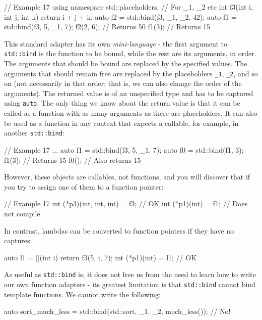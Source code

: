 \begin{code}
// Example 17
using namespace std::placeholders; // For _1, _2 etc
int f3(int i, int j, int k) { return i + j + k; }
auto f2 = std::bind(f3, _1, _2, 42);
auto f1 = std::bind(f3, 5, _1, 7);
f2(2, 6);     // Returns 50
f1(3);     // Returns 15
\end{code}

This standard adapter has its own \emph{mini-language} - the first argument to \texttt{std::bind} is the function to be bound, while the rest are its arguments, in order. The arguments that should be bound are replaced by the specified values. The arguments that should remain free are replaced by the placeholders \texttt{\_1}, \texttt{\_2}, and so on (not necessarily in that order; that is, we can also change the order of the arguments). The returned value is of an unspecified type and has to be captured using \texttt{auto}. The only thing we know about the return value is that it can be called as a function with as many arguments as there are placeholders. It can also be used as a function in any context that expects a callable, for example, in another \texttt{std::bind}:

\begin{code}
// Example 17
...
auto f1 = std::bind(f3, 5, _1, 7);
auto f0 = std::bind(f1, 3);
f1(3);    // Returns 15
f0();         // Also returns 15
\end{code}

However, these objects are callables, not functions, and you will discover that if you try to assign one of them to a function pointer:

\begin{code}
// Example 17
int (*p3)(int, int, int) = f3;    // OK
int (*p1)(int) = f1;            // Does not compile
\end{code}

In contrast, lambdas can be converted to function pointers if they have no captures:

\begin{code}
auto l1 = [](int i) { return f3(5, i, 7); }
int (*p1)(int) = l1;            // OK
\end{code}

As useful as \texttt{std::bind} is, it does not free us from the need to learn how to write our own function adapters - its greatest limitation is that \texttt{std::bind} cannot bind template functions. We cannot write the following:

\begin{code}
auto sort_much_less = std::bind(std::sort, _1, _2, much_less()); // No!
\end{code}

